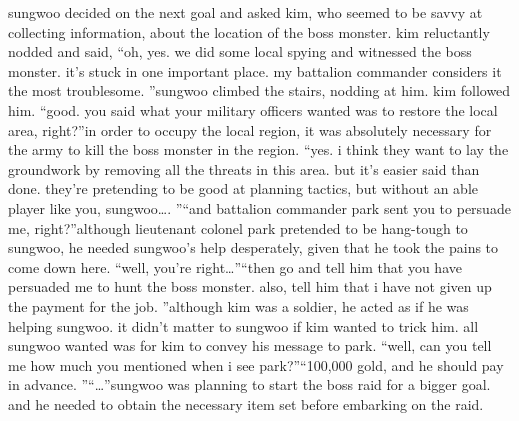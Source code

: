 sungwoo decided on the next goal and asked kim, who seemed to be savvy at collecting information, about the location of the boss monster.
kim reluctantly nodded and said, “oh, yes.
 we did some local spying and witnessed the boss monster.
 it’s stuck in one important place.
 my battalion commander considers it the most troublesome.
”sungwoo climbed the stairs, nodding at him.
 kim followed him.
“good.
 you said what your military officers wanted was to restore the local area, right?”in order to occupy the local region, it was absolutely necessary for the army to kill the boss monster in the region.
“yes.
 i think they want to lay the groundwork by removing all the threats in this area.
 but it’s easier said than done.
 they’re pretending to be good at planning tactics, but without an able player like you, sungwoo….
”“and battalion commander park sent you to persuade me, right?”although lieutenant colonel park pretended to be hang-tough to sungwoo, he needed sungwoo’s help desperately, given that he took the pains to come down here.
“well, you’re right…”“then go and tell him that you have persuaded me to hunt the boss monster.
 also, tell him that i have not given up the payment for the job.
”although kim was a soldier, he acted as if he was helping sungwoo.
 it didn’t matter to sungwoo if kim wanted to trick him.
 all sungwoo wanted was for kim to convey his message to park.
“well, can you tell me how much you mentioned when i see park?”“100,000 gold, and he should pay in advance.
”“…”sungwoo was planning to start the boss raid for a bigger goal.
and he needed to obtain the necessary item set before embarking on the raid.


 